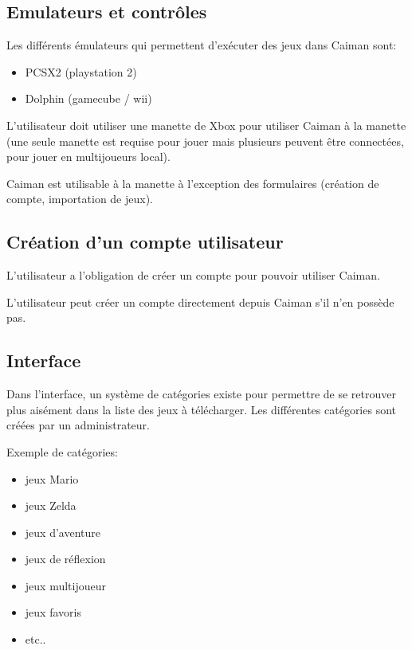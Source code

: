 \documentclass[a4paper,12pt,french]{sphinxmanual}
\begin{document}
\subsection{Emulateurs et contrôles}
\label{\detokenize{cdc:emulateurs-et-controles}}
\sphinxAtStartPar
Les différents émulateurs qui permettent d’exécuter des jeux dans Caiman sont:
\begin{itemize}
\item {} 
\sphinxAtStartPar
PCSX2 (playstation 2)

\item {} 
\sphinxAtStartPar
Dolphin (gamecube / wii)

\end{itemize}

\sphinxAtStartPar
L’utilisateur doit utiliser une manette de Xbox pour utiliser Caiman à la manette (une seule manette est requise pour jouer mais plusieurs peuvent être connectées, pour jouer en multijoueurs local).

\sphinxAtStartPar
Caiman est utilisable à la manette à l’exception des formulaires (création de compte, importation de jeux).


\subsection{Création d’un compte utilisateur}
\label{\detokenize{cdc:creation-dun-compte-utilisateur}}
\sphinxAtStartPar
L’utilisateur a l’obligation de créer un compte pour pouvoir utiliser Caiman.

\sphinxAtStartPar
L’utilisateur peut créer un compte directement depuis Caiman s’il n’en possède pas.


\subsection{Interface}
\label{\detokenize{cdc:interface}}
\sphinxAtStartPar
Dans l’interface, un système de catégories existe pour permettre de se retrouver plus aisément dans la liste des jeux à télécharger. Les différentes catégories sont créées par un administrateur.

\sphinxAtStartPar
Exemple de catégories:
\begin{itemize}
\item {} 
\sphinxAtStartPar
jeux Mario

\item {} 
\sphinxAtStartPar
jeux Zelda

\item {} 
\sphinxAtStartPar
jeux d’aventure

\item {} 
\sphinxAtStartPar
jeux de réflexion

\item {} 
\sphinxAtStartPar
jeux multijoueur

\item {} 
\sphinxAtStartPar
jeux favoris

\item {} 
\sphinxAtStartPar
etc..

\end{itemize}
\end{document}
